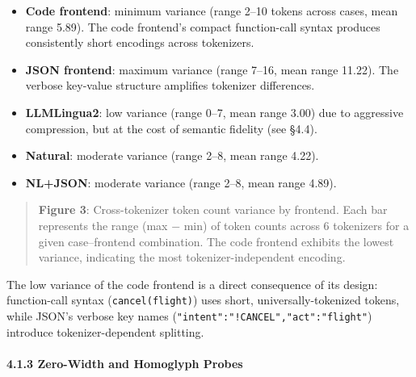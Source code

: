 \begin{itemize}

\tightlist

\item

  \textbf{Code frontend}: minimum variance (range 2--10 tokens across cases, mean range 5.89). The code frontend's compact function-call syntax produces consistently short encodings across tokenizers.

\item

  \textbf{JSON frontend}: maximum variance (range 7--16, mean range 11.22). The verbose key-value structure amplifies tokenizer differences.

\item

  \textbf{LLMLingua2}: low variance (range 0--7, mean range 3.00) due to aggressive compression, but at the cost of semantic fidelity (see §4.4).

\item

  \textbf{Natural}: moderate variance (range 2--8, mean range 4.22).

\item

  \textbf{NL+JSON}: moderate variance (range 2--8, mean range 4.89).

\end{itemize}



\begin{quote}

\textbf{Figure 3}: Cross-tokenizer token count variance by frontend. Each bar represents the range (max − min) of token counts across 6 tokenizers for a given case--frontend combination. The code frontend exhibits the lowest variance, indicating the most tokenizer-independent encoding.

\end{quote}



The low variance of the code frontend is a direct consequence of its design: function-call syntax (\texttt{cancel(flight)}) uses short, universally-tokenized tokens, while JSON's verbose key names (\texttt{"intent":"!CANCEL","act":"flight"}) introduce tokenizer-dependent splitting.



\paragraph{4.1.3 Zero-Width and Homoglyph Probes}\label{zero-width-and-homoglyph-probes}




